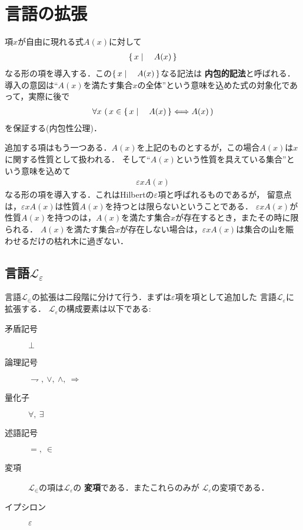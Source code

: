 \section{言語の拡張}
	項$x$が自由に現れる式$A(x)$に対して
	\begin{align}
		\left\{\, x \mid \quad A(x)\, \right\}
	\end{align}
	なる形の項を導入する．この$\left\{\, x \mid \quad A(x)\, \right\}$なる記法は
	{\bf 内包的記法}と呼ばれる．
	導入の意図は``$A(x)$を満たす集合$x$の全体''という意味を込めた式の対象化であって，実際に後で
	\begin{align}
		\forall x\, \left(\, x \in \left\{\, x \mid \quad A(x)\, \right\} \Longleftrightarrow A(x)\, \right)
	\end{align}
	を保証する(内包性公理)．
	
	追加する項はもう一つある．$A(x)$を上記のものとするが，この場合$A(x)$は$x$に関する性質として扱われる．
	そして``$A(x)$という性質を具えている集合''という意味を込めて
	\begin{align}
		\varepsilon x A(x)
	\end{align}
	なる形の項を導入する．これはHilbertの$\varepsilon$項と呼ばれるものであるが，
	留意点は，$\varepsilon x A(x)$は性質$A(x)$を持つとは限らないということである．
	$\varepsilon x A(x)$が性質$A(x)$を持つのは，$A(x)$を満たす集合$x$が存在するとき，またその時に限られる．
	$A(x)$を満たす集合$x$が存在しない場合は，$\varepsilon x A(x)$は集合の山を賑わせるだけの枯れ木に過ぎない．
	
\subsection{言語$\mathcal{L}_{\varepsilon}$}
	言語$\mathcal{L}_{\in}$の拡張は二段階に分けて行う．まずは$\varepsilon$項を項として追加した
	言語$\mathcal{L}_{\varepsilon}$に拡張する．
	$\mathcal{L}_{\varepsilon}$の構成要素は以下である:
	
	\begin{description}
		\item[矛盾記号] $\bot$
		\item[論理記号] $\rightharpoondown,\ \vee,\ \wedge,\ \Longrightarrow$
		\item[量化子] $\forall,\ \exists$
		\item[述語記号] $=,\ \in$
		\item[変項] $\mathcal{L}_{\in}$の項は$\mathcal{L}_{\varepsilon}$の
			{\bf 変項}である．またこれらのみが
			$\mathcal{L}_{\varepsilon}$の変項である．
		\item[イプシロン] $\varepsilon$
	\end{description}
	
